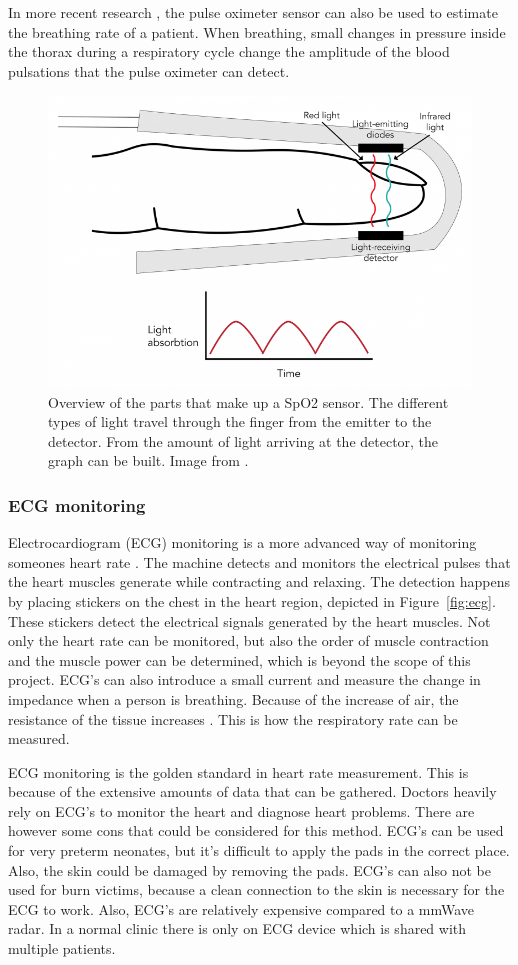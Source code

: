 In more recent research \cite{motin2019selection}, the pulse oximeter sensor can also be used to estimate the breathing rate of a patient. When breathing, small changes in pressure inside the thorax during a respiratory cycle change the amplitude of the blood pulsations that the pulse oximeter can detect.

\begin{figure}[t]
\centering
\includegraphics[width=.7\textwidth]{figures/background/pulse_oximeter.png}
\caption{Overview of the parts that make up a SpO2 sensor. The different types of light travel through the finger from the emitter to the detector. From the amount of light arriving at the detector, the graph can be built. Image from \cite{pulse_oximeter_website}.}
\label{fig:pulse_oxymeter}
\end{figure}

\subsubsection{ECG monitoring}
Electrocardiogram (ECG) monitoring is a more advanced way of monitoring someones heart rate \cite{berkaya2018survey}. The machine detects and monitors the electrical pulses that the heart muscles generate while contracting and relaxing. The detection happens by placing stickers on the chest in the heart region, depicted in Figure~\ref{fig:ecg}. These stickers detect the electrical signals generated by the heart muscles. Not only the heart rate can be monitored, but also the order of muscle contraction and the muscle power can be determined, which is beyond the scope of this project. ECG's can also introduce a small current and measure the change in impedance when a person is breathing. Because of the increase of air, the resistance of the tissue increases \cite{charlton2017breathing}. This is how the respiratory rate can be measured.

ECG monitoring is the golden standard in heart rate measurement. This is because of the extensive amounts of data that can be gathered. Doctors heavily rely on ECG's to monitor the heart and diagnose heart problems. There are however some cons that could be considered for this method. ECG's can be used for very preterm neonates, but it's difficult to apply the pads in the correct place. Also, the skin could be damaged by removing the pads. ECG's can also not be used for burn victims, because a clean connection to the skin is necessary for the ECG to work. Also, ECG's are relatively expensive compared to a mmWave radar. In a normal clinic there is only on ECG device which is shared with multiple patients.


